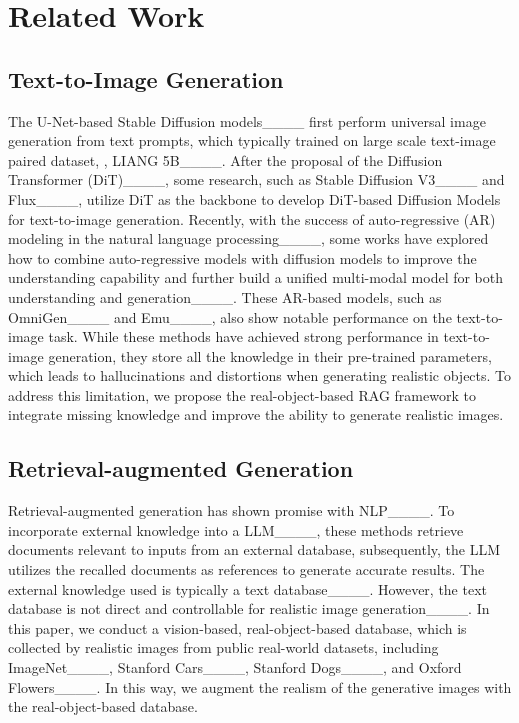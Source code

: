 \section{Related Work}
\subsection{Text-to-Image Generation}
The U-Net-based Stable Diffusion models____ first perform universal image generation from text prompts, which typically trained on large scale text-image paired dataset, \aka, LIANG 5B____. After the proposal of the Diffusion Transformer (DiT)____, some research, such as Stable Diffusion V3____ and Flux____, utilize DiT as the backbone to develop DiT-based Diffusion Models for text-to-image generation. Recently, with the success of auto-regressive (AR) modeling in the natural language processing____, some works have explored how to combine auto-regressive models with diffusion models to improve the understanding capability and further build a unified multi-modal model for both understanding and generation____. These AR-based models, such as OmniGen____ and Emu____, also show notable performance on the text-to-image task. While these methods have achieved strong performance in text-to-image generation, they store all the knowledge in their pre-trained parameters, which leads to hallucinations and distortions when generating realistic objects. To address this limitation, we propose the real-object-based RAG framework to integrate missing knowledge and improve the ability to generate realistic images.

\subsection{Retrieval-augmented Generation}
Retrieval-augmented generation has shown promise with NLP____. To incorporate external knowledge into a LLM____, these methods retrieve documents relevant to inputs from an external database, subsequently, the LLM utilizes the recalled documents as references to generate accurate results. The external knowledge used is typically a text database____. However, the text database is not direct and controllable for realistic image generation____. In this paper, we conduct a vision-based, real-object-based database, which is collected by realistic images from public real-world datasets, including ImageNet____, Stanford Cars____, Stanford Dogs____, and Oxford Flowers____. In this way, we augment the realism of the generative images with the real-object-based database.

